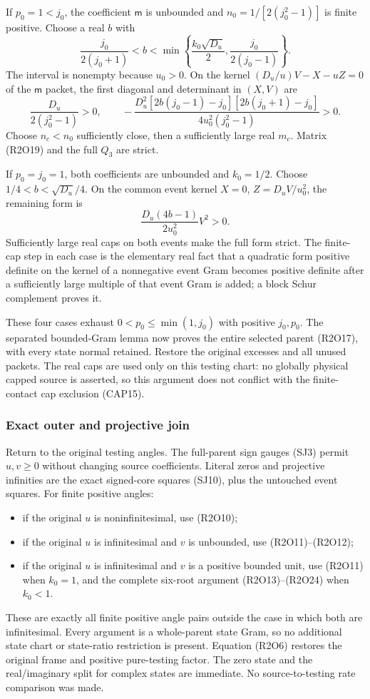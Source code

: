 If $p_0=1<j_0$, the coefficient $\mathsf m$ is unbounded and
$n_0=1/[2(j_0^2-1)]$ is finite positive.  Choose a real $b$ with
\[
\frac{j_0}{2(j_0+1)}<b<
\min\left\{\frac{k_0\sqrt{D_u}}2,
                 \frac{j_0}{2(j_0-1)}\right\}.
\]
The interval is nonempty because $u_0>0$.  On the kernel
$(D_u/u)V-X-uZ=0$ of the $\mathsf m$ packet, the first diagonal
and determinant in $(X,V)$ are
\[
\frac{D_u}{2(j_0^2-1)}>0,\qquad
-\frac{D_u^2[2b(j_0-1)-j_0][2b(j_0+1)-j_0]}
       {4u_0^2(j_0^2-1)}>0.
\tag{R2O23}
\]
Choose $n_c<n_0$ sufficiently close, then a sufficiently large real
$m_c$.  Matrix (R2O19) and the full $Q_3$ are strict.

If $p_0=j_0=1$, both coefficients are unbounded and $k_0=1/2$.
Choose $1/4<b<\sqrt{D_u}/4$.  On the common event kernel
$X=0$, $Z=D_uV/u_0^2$, the remaining form is
\[
\frac{D_u(4b-1)}{2u_0^2}V^2>0.
\tag{R2O24}
\]
Sufficiently large real caps on both events make the full form strict.
The finite-cap step in each case is the elementary real fact that a
quadratic form positive definite on the kernel of a nonnegative event
Gram becomes positive definite after a sufficiently large multiple of
that event Gram is added; a block Schur complement proves it.

These four cases exhaust $0<p_0\leq\min(1,j_0)$ with positive $j_0,p_0$.
The separated bounded-Gram lemma now proves the entire selected parent
(R2O17), with every state normal retained.  Restore the original excesses
and all unused packets.  The real caps are used only on this testing
chart: no globally physical capped source is asserted, so this argument
does not conflict with the finite-contact cap exclusion (CAP15).

\subsubsection*{Exact outer and projective join}

Return to the original testing angles.  The full-parent sign gauges
(SJ3) permit $u,v\geq0$ without changing source coefficients.  Literal
zeros and projective infinities are the exact signed-core squares
(SJ10), plus the untouched event squares.  For finite positive angles:
\begin{itemize}
\item if the original $u$ is noninfinitesimal, use (R2O10);
\item if the original $u$ is infinitesimal and $v$ is unbounded,
      use (R2O11)--(R2O12);
\item if the original $u$ is infinitesimal and $v$ is a positive
      bounded unit, use (R2O11) when $k_0=1$, and the complete
      six-root argument (R2O13)--(R2O24) when $k_0<1$.
\end{itemize}
These are exactly all finite positive angle pairs outside the case in
which both are infinitesimal.  Every argument is a whole-parent state
Gram, so no additional state chart or state-ratio restriction is present.
Equation (R2O6) restores the original frame and positive pure-testing
factor.  The zero state and the real/imaginary split for complex states
are immediate.  No source-to-testing rate comparison was made.

